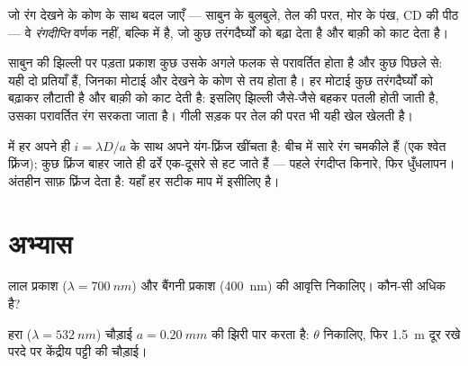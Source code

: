 \begin{definition}[रंगदीप्ति]\label{def:g12:light-as-wave:iridescence}
जो रंग देखने के कोण के साथ बदल जाएँ --- साबुन के बुलबुले, तेल की परत, मोर के
पंख, CD की पीठ --- वे \emph{रंगदीप्ति}%
वर्णक नहीं, बल्कि  में  है, जो कुछ
तरंगदैर्घ्यों को बढ़ा देता है और बाक़ी को काट देता है।
\end{definition}

\begin{example}[साबुन की झिल्ली और तेल की परत]\label{ex:g12:light-as-wave:soap}
साबुन की झिल्ली पर पड़ता प्रकाश कुछ उसके अगले फलक से परावर्तित होता है और कुछ
पिछले से: यही दो  प्रतियाँ हैं, जिनका 
मोटाई और देखने के कोण से तय होता है। हर मोटाई कुछ तरंगदैर्घ्यों को
बढ़ाकर लौटाती है और बाक़ी को काट देती है: इसलिए झिल्ली जैसे-जैसे बहकर
पतली होती जाती है, उसका परावर्तित रंग सरकता जाता है। गीली सड़क पर तेल
की परत भी यही खेल खेलती है।
\end{example}

\begin{remark}[एकवर्णी बनाम श्वेत प्रकाश]\label{rem:g12:light-as-wave:white}
 में हर  अपने ही $i = \lambda D/a$ के साथ अपने
यंग-फ़्रिंज खींचता है: बीच में सारे रंग चमकीले हैं (एक श्वेत फ़्रिंज); कुछ
फ़्रिंज बाहर जाते ही ढर्रे एक-दूसरे से हट जाते हैं --- पहले रंगदीप्त किनारे,
फिर धुँधलापन।  अंतहीन साफ़ फ़्रिंज देता है: यहाँ हर
सटीक माप में  इसीलिए है।
\end{remark}

\section{अभ्यास}

\begin{exercise}[$\star$]\label{exo:g12:light-as-wave:1}
लाल प्रकाश ($\lambda = \qty{700}{nm}$) और बैंगनी प्रकाश (\qty{400}{nm}) की आवृत्ति निकालिए।
कौन-सी अधिक है?
\end{exercise}

\begin{exercise}[$\star$]\label{exo:g12:light-as-wave:2}
हरा  ($\lambda = \qty{532}{nm}$) चौड़ाई $a = \qty{0.20}{mm}$ की झिरी पार करता है: $\theta$
निकालिए, फिर \qty{1.5}{m} दूर रखे परदे पर केंद्रीय पट्टी की चौड़ाई।
\end{exercise}

